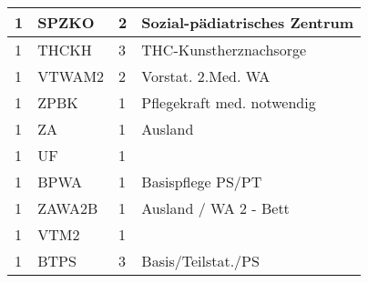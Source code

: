 \begin{center}
\begin{longtable}{|p{2.3cm}|p{2.3cm}|p{2.2cm}|p{6cm}|}
1 & SPZKO & 2 & Sozial-pädiatrisches Zentrum \\ \hline
1 & THCKH & 3 & THC-Kunstherznachsorge \\ \hline
1 & VTWAM2 & 2 & Vorstat. 2.Med.  WA \\ \hline
1 & ZPBK & 1 & Pflegekraft med. notwendig \\ \hline
1 & ZA & 1 & Ausland \\ \hline
1 & UF & 1 &  \\ \hline
1 & BPWA & 1 & Basispflege PS/PT \\ \hline
1 & ZAWA2B & 1 & Ausland / WA 2 - Bett \\ \hline
1 & VTM2 & 1 &  \\ \hline
1 & BTPS & 3 & Basis/Teilstat./PS \\ \hline
\end{longtable}
\end{center}
